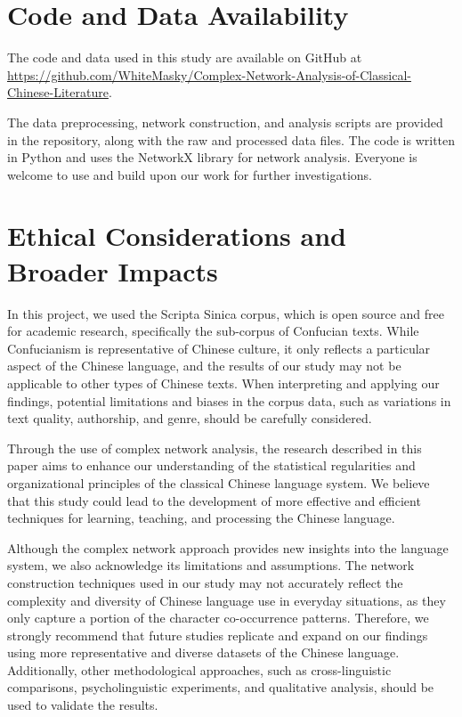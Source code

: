 \documentclass[11pt]{article}
\begin{document}
\section*{Code and Data Availability}
The code and data used in this study are available on GitHub at \url{https://github.com/WhiteMasky/Complex-Network-Analysis-of-Classical-Chinese-Literature}. 

The data preprocessing, network construction, and analysis scripts are provided in the repository, along with the raw and processed data files. The code is written in Python and uses the NetworkX library for network analysis. Everyone is welcome to use and build upon our work for further investigations.
\section*{Ethical Considerations and Broader Impacts}
In this project, we used the Scripta Sinica corpus, which is open source and free for academic research, specifically the sub-corpus of Confucian texts. While Confucianism is representative of Chinese culture, it only reflects a particular aspect of the Chinese language, and the results of our study may not be applicable to other types of Chinese texts. When interpreting and applying our findings, potential limitations and biases in the corpus data, such as variations in text quality, authorship, and genre, should be carefully considered.

Through the use of complex network analysis, the research described in this paper aims to enhance our understanding of the statistical regularities and organizational principles of the classical Chinese language system. We believe that this study could lead to the development of more effective and efficient techniques for learning, teaching, and processing the Chinese language.

Although the complex network approach provides new insights into the language system, we also acknowledge its limitations and assumptions. The network construction techniques used in our study may not accurately reflect the complexity and diversity of Chinese language use in everyday situations, as they only capture a portion of the character co-occurrence patterns. Therefore, we strongly recommend that future studies replicate and expand on our findings using more representative and diverse datasets of the Chinese language. Additionally, other methodological approaches, such as cross-linguistic comparisons, psycholinguistic experiments, and qualitative analysis, should be used to validate the results.
\end{document}
